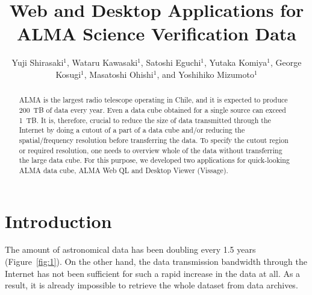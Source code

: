 \documentclass[11pt,twoside]{article}
\begin{document}
\title{Web and Desktop Applications for ALMA Science Verification Data}

\author{Yuji Shirasaki$^1$, 
        Wataru Kawasaki$^1$,
        Satoshi Eguchi$^1$,
        Yutaka Komiya$^1$,
        George Kosugi$^1$,
        Masatoshi Ohishi$^1$,
        and Yoshihiko Mizumoto$^1$}


\begin{abstract}
ALMA is the largest radio telescope operating in Chile, and 
it is expected to produce 200~TB of data every year. 
Even a data cube obtained for a single source can exceed 1~TB.
It is, therefore, crucial to reduce the size of data transmitted through 
the Internet by doing a cutout of a part of a data cube and/or 
reducing the spatial/frequency resolution before transferring the data. 
To specify the cutout region or required resolution, one needs to overview
whole of the data without transferring the large data cube. 
For this purpose, we developed two applications for quick-looking 
ALMA data cube, ALMA Web QL and Desktop Viewer (Vissage). 
\end{abstract}

\section{Introduction}

The amount of astronomical data has been doubling every 1.5 years 
(Figure~\ref{fig:1}).
On the other hand, the data transmission bandwidth through the Internet 
has not been sufficient for such a rapid increase in the data at all. 
As a result, it is already impossible to retrieve the whole dataset from 
data archives. 
\end{document}
